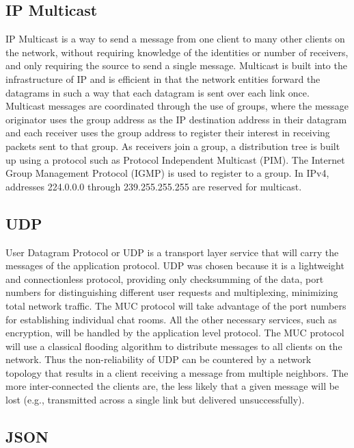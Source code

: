 \documentclass{article}
\begin{document}
\subsection{IP Multicast}

IP Multicast is a way to send a message from one client to many other clients on
the network, without requiring knowledge of the identities or number of
receivers, and only requiring the source to send a single message. Multicast is
built into the infrastructure of IP and is efficient in that the network
entities forward the datagrams in such a way that each datagram is sent over
each link once. Multicast messages are coordinated through the use of groups,
where the message originator uses the group address as the IP destination
address in their datagram and each receiver uses the group address to register
their interest in receiving packets sent to that group. As receivers join a
group, a distribution tree is built up using a protocol such as Protocol
Independent Multicast (PIM). The Internet Group Management Protocol (IGMP) is
used to register to a group. In IPv4, addresses 224.0.0.0 through
239.255.255.255 are reserved for multicast.

\subsection{UDP}

User Datagram Protocol or UDP is a transport layer service that will carry the
messages of the application protocol.   UDP was chosen because it is a
lightweight and connectionless protocol, providing only checksumming of the
data, port numbers for distinguishing different user requests and multiplexing,
minimizing total network traffic. The MUC protocol will take advantage of the
port numbers for establishing individual chat rooms.  All the other necessary
services, such as encryption, will be handled by the application level protocol.
The MUC protocol will use a classical flooding algorithm to distribute messages
to all clients on the network. Thus the non-reliability of UDP can be countered
by a network topology that results in a client receiving a message from multiple
neighbors. The more inter-connected the clients are, the less likely that a
given message will be lost (e.g., transmitted across a single link but delivered
unsuccessfully).

\subsection{JSON}
\end{document}
